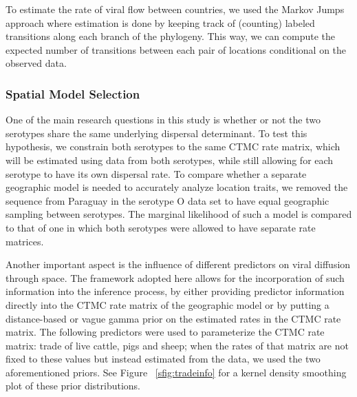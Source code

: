 \documentclass[10pt]{article}
\begin{document}

To estimate the rate of viral flow between countries, we used the Markov Jumps~\cite{Minin2008} approach where estimation is done by keeping track of (counting) labeled transitions along each branch of the phylogeny.
This way, we can compute the expected number of transitions between each pair of locations conditional on the observed data.


\subsubsection*{Spatial Model Selection}

One of the main research questions in this study is whether or not the two serotypes share the same underlying dispersal determinant. 
To test this hypothesis, we constrain both serotypes to the same CTMC rate matrix, which will be estimated using data from both serotypes, while still allowing for each serotype to have its own dispersal rate.
To compare whether a separate geographic model is needed to accurately analyze location traits, we removed the sequence from Paraguay in the serotype O data set to have equal geographic sampling between serotypes.
The marginal likelihood of such a model is compared to that of one in which both serotypes were allowed to have separate rate matrices.

Another important aspect is the influence of different predictors on viral diffusion through space.
The framework adopted here allows for the incorporation of such information into the inference process, by either providing predictor information directly into the CTMC rate matrix of the geographic model or by putting a distance-based or vague gamma prior on the estimated rates in the CTMC rate matrix. 
The following predictors were used to parameterize the CTMC rate matrix: trade of live cattle, pigs and sheep; when the rates of that matrix are not fixed to these values but instead estimated from the data, we used the two aforementioned priors.
See Figure ~\ref{sfig:tradeinfo} for a kernel density smoothing plot of these prior distributions.
\end{document}
